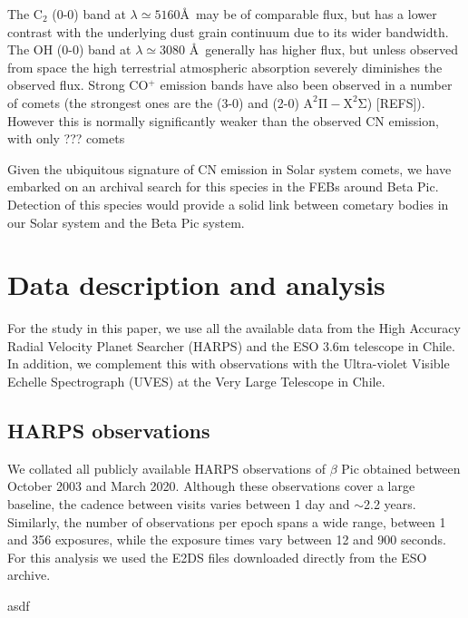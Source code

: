 \documentclass{aa}
\begin{document}
The C$_2$ (0-0) band at $\lambda\simeq 5160$\AA \ may be of comparable flux, but has a lower contrast with the underlying dust grain continuum due to its wider bandwidth. The OH (0-0) band at $\lambda\simeq 3080$ \AA \ generally has higher flux, but unless observed from space the high terrestrial atmospheric absorption severely diminishes the observed flux. Strong CO$^+$ emission bands have also been observed in a number of comets (the strongest ones are the (3-0) and (2-0) $\mathrm{A^2\Pi-X^2\Sigma}$) [REFS]). However this is normally significantly weaker than the observed CN emission, with only ??? comets 

Given the ubiquitous signature of CN emission in Solar system comets, we have embarked on an archival search for this species in the FEBs around Beta Pic. Detection of this species would provide a solid link between cometary bodies in our Solar system and the Beta Pic system.

\section{Data description and analysis}
For the study in this paper, we use all the available data from the High Accuracy Radial Velocity Planet Searcher (HARPS) and the ESO 3.6m telescope in Chile. In addition, we complement this with observations with the Ultra-violet Visible Echelle Spectrograph (UVES) at the Very Large Telescope in Chile. 

\subsection{HARPS observations}
We collated all publicly available HARPS observations of $\beta$ Pic obtained between October 2003 and March 2020. Although these observations cover a large baseline, the cadence between visits varies between 1 day and $\sim$2.2 years. Similarly, the number of observations per epoch spans a wide range, between 1 and 356 exposures, while the exposure times vary between 12 and 900 seconds. For this analysis we used the E2DS files downloaded directly from the ESO archive.



asdf
\end{document}

